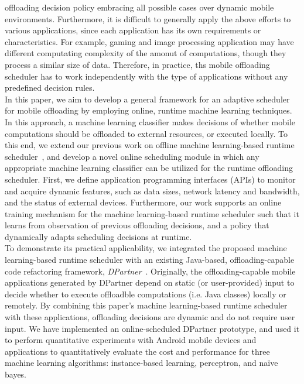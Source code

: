\documentclass[10pt, conference, compsocconf]{IEEEtran}
\begin{document}
offloading decision policy embracing all possible cases over dynamic
mobile environments.
% 
Furthermore, it is difficult to generally apply the above efforts to
various applications, since each application has its own requirements or
characteristics.
%
For example, gaming and image processing application may have different
computating complexity of the amonut of computations, though they
process a similar size of data.
%
Therefore, in practice, ths mobile offloading scheduler has to work
independently with the type of applications without any predefined
decision rules.\\ 
%
\indent In this paper, we aim to develop a general framework for an
adaptive scheduler for mobile offloading by employing online, runtime
machine learning techniques.
%
In this approach, a machine learning classifier makes decisions of
whether mobile computations should be offloaded to external resources,
or executed locally. 
%
To this end, we extend our previous work on offline machine
learning-based runtime scheduler~\cite{ml}, and develop a novel online
scheduling module in which any appropriate machine learning classifier
can be utilized for the runtime offloading scheduler.
%
First, we define application programming interfaces (APIs) to monitor and
acquire dynamic features, such as data sizes, network latency and
bandwidth, and the status of external devices.
%
Furthermore, our work supports an online training mechanism for
the machine learning-based runtime scheduler such that it learns from
observation of previous offloading decisions, and a policy that
dynamically adapts scheduling decisions at runtime.\\
%
\indent To demonstrate its practical applicability, we integrated the
proposed machine learning-based runtime scheduler with an existing
Java-based, offloading-capable code refactoring framework,
\textit{DPartner}~\cite{dpartner}.
%
Originally, the offloading-capable mobile applications generated by
DPartner depend on static (or user-provided) input to decide whether to
execute offloadble computations (i.e. Java classes) locally or remotely.
%
By combining this paper's machine learning-based runtime scheduler with
these applications, offloading decisions are dynamic and do not require
user input.
%
We have implemented an online-scheduled DPartner prototype, and used it
to perform quantitative experiments with Android mobile devices and
applications to quantitatively evaluate the cost and performance for
three machine learning algorithms: instance-based learning, perceptron,
and na\"{i}ve bayes.
\end{document}
